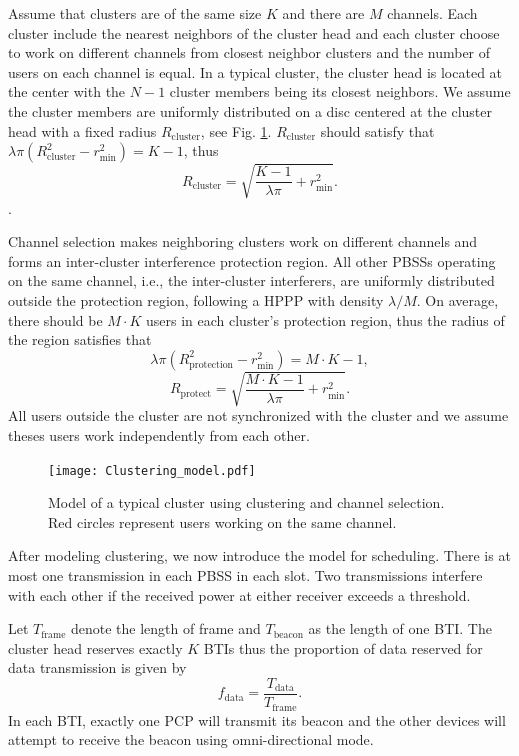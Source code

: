 \documentclass[10pt, conference, letterpaper]{IEEEtran}
\begin{document}
Assume that clusters are of the same size $K$ and there are $M$ channels. Each cluster include the nearest neighbors of the cluster head and each cluster choose to work on different channels from closest neighbor clusters and the number of users on each channel is equal.
In a typical cluster, the cluster head is located at the center with the $N-1$ cluster members being its closest neighbors.
We assume the cluster members are uniformly distributed on a disc centered at the cluster head with a fixed radius $R_{\mathrm{cluster}}$, see Fig. \ref{fig:clusteranalysis:model}. $R_{\mathrm{cluster}}$ should satisfy that $\lambda \pi (R_{\mathrm{cluster}}^2 - r_{\min}^2) = K - 1$, thus 
\begin{equation*}
R_{\mathrm{cluster}} = \sqrt{\frac{K - 1}{\lambda\pi}+r_{\min}^2}.
\end{equation*}.

Channel selection makes neighboring clusters work on different channels and forms an inter-cluster interference protection region. 
All other PBSSs operating on the same channel, i.e., the inter-cluster interferers, are uniformly distributed outside the protection region, following a HPPP with density $\lambda/M$. On average, there should be $M\cdot K$ users in each cluster's protection region, thus the radius of the region satisfies that 
\begin{equation*}
\lambda \pi (R_{\mathrm{protection}}^2 - r_{\min}^2) = M\cdot K - 1,
\end{equation*}
\begin{equation*}
R_{\mathrm{protect}} = \sqrt{\frac{M\cdot K - 1}{\lambda \pi} + r_{\min}^2}.
\end{equation*}
All users outside the cluster are not synchronized with the cluster and we assume theses users work independently from each other.  

\begin{figure}
	\centering
	\texttt{[image: Clustering\_model.pdf]}
	\caption{Model of a typical cluster using clustering and channel selection. Red circles represent users working on the same channel.}
	\label{fig:clusteranalysis:model}
\end{figure}


After modeling clustering, we now introduce the model for scheduling.
There is at most one transmission in each PBSS in each slot. 
Two transmissions interfere with each other if the received power at either receiver exceeds a threshold.

Let $T_{\mathrm{frame}}$ denote the length of frame and $T_{\mathrm{beacon}}$ as the length of one BTI. 
The cluster head reserves exactly $K$ BTIs thus the proportion of data reserved for data transmission is given by
\begin{equation*}
f_{\mathrm{data}} = \frac{T_{\mathrm{data}}}{T_{\mathrm{frame}}}.
\end{equation*}
In each BTI, exactly one PCP will transmit its beacon and the other devices will attempt to receive the beacon using omni-directional mode. 
\end{document}
